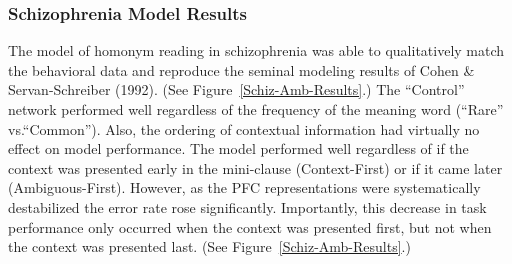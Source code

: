 \subsubsection{Schizophrenia Model Results}
The model of homonym reading in schizophrenia was able to qualitatively match the behavioral data and reproduce the seminal modeling results of Cohen \& Servan-Schreiber (1992). (See Figure~\ref{Schiz-Amb-Results}.)  The ``Control'' network performed well regardless of the frequency of the meaning word (``Rare'' vs.``Common'').   Also, the ordering of contextual information had virtually no effect on model performance.  The model performed well regardless of if the context was presented early in the mini-clause (Context-First) or if it came later (Ambiguous-First).  However, as the PFC representations were systematically destabilized the error rate rose significantly. Importantly, this decrease in task performance only occurred when the context was presented first, but not when the context was presented last.  (See Figure~\ref{Schiz-Amb-Results}.)  
